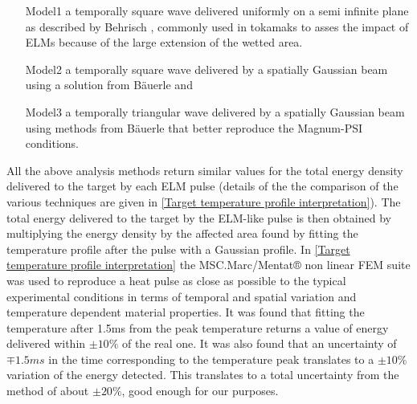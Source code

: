 \begin{itemize}
    \item[Model1] a temporally square wave delivered uniformly on a semi infinite plane as described by Behrisch \cite{Behrisch1980}, commonly used in tokamaks to asses the impact of ELMs because of the large extension of the wetted area.
    \item[Model2] a temporally square wave delivered by a spatially Gaussian beam using a solution from Bäuerle \cite{Bauerle2011,Yu2016} and
    \item[Model3] a temporally triangular wave delivered by a spatially Gaussian beam using methods from Bäuerle that better reproduce the Magnum-PSI conditions.
\end{itemize}
All the above analysis methods return similar values for the total energy density delivered to the target by each ELM pulse (details of the the comparison of the various techniques are given in \autoref{Target temperature profile interpretation}). The total energy delivered to the target by the ELM-like pulse is then obtained by multiplying the energy density by the affected area found by fitting the temperature profile after the pulse with a Gaussian profile. In \autoref{Target temperature profile interpretation} the MSC.Marc/Mentat® non linear FEM suite was used to reproduce a heat pulse as close as possible to the typical experimental conditions in terms of temporal and spatial variation and temperature dependent material properties. It was found that fitting the temperature after 1.5ms from the peak temperature returns a value of energy delivered within $\pm10\%$ of the real one. It was also found that an uncertainty of $\mp1.5ms$ in the time corresponding to the temperature peak translates to a $\pm10\%$ variation of the energy detected. This translates to a total uncertainty from the method of about $\pm20\%$, good enough for our purposes.

